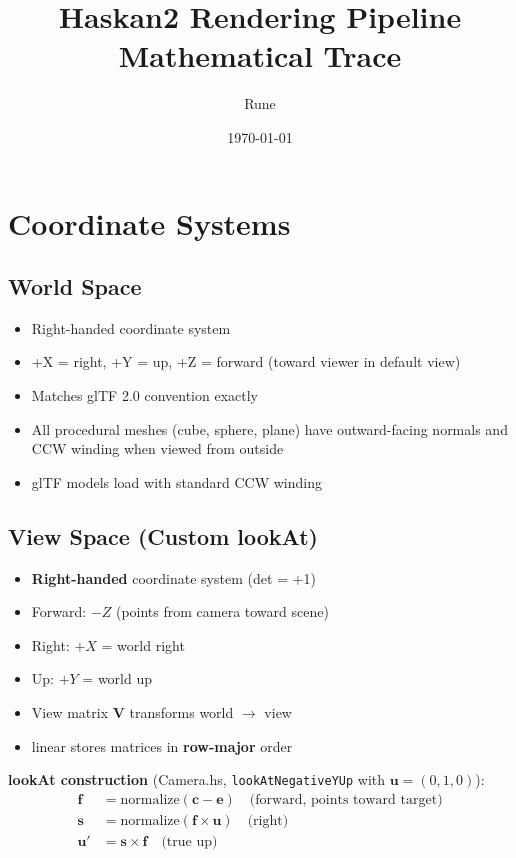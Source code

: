 \documentclass{article}
\title{Haskan2 Rendering Pipeline Mathematical Trace}
\author{Rune}
\date{\today}
\begin{document}
\maketitle

\section{Coordinate Systems}

\subsection{World Space}
\begin{itemize}
\item Right-handed coordinate system
\item +X = right, +Y = up, +Z = forward (toward viewer in default view)
\item Matches glTF 2.0 convention exactly
\item All procedural meshes (cube, sphere, plane) have outward-facing normals and CCW winding when viewed from outside
\item glTF models load with standard CCW winding
\end{itemize}

\subsection{View Space (Custom lookAt)}
\begin{itemize}
\item \textbf{Right-handed} coordinate system (det = +1)
\item Forward: $-Z$ (points from camera toward scene)
\item Right: $+X$ = world right
\item Up: $+Y$ = world up
\item View matrix $\mathbf{V}$ transforms world $\to$ view
\item linear stores matrices in \textbf{row-major} order
\end{itemize}

\textbf{lookAt construction} (Camera.hs, \texttt{lookAtNegativeYUp} with $\mathbf{u} = (0,1,0)$):
\begin{align}
\mathbf{f} &= \text{normalize}(\mathbf{c} - \mathbf{e}) \quad \text{(forward, points toward target)} \\
\mathbf{s} &= \text{normalize}(\mathbf{f} \times \mathbf{u}) \quad \text{(right)} \\
\mathbf{u'} &= \mathbf{s} \times \mathbf{f} \quad \text{(true up)}
\end{align}
\end{document}
